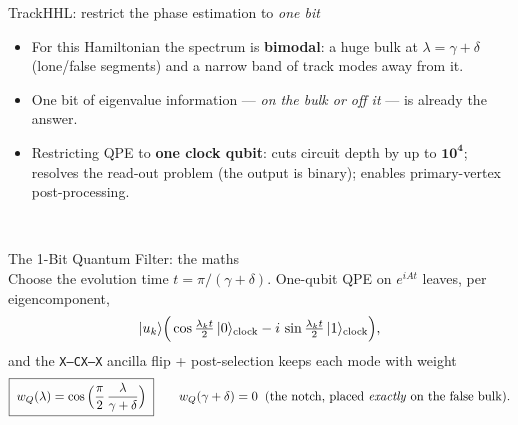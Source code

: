 \begin{frame}{TrackHHL: restrict the phase estimation to \emph{one bit}}
  \begin{itemize}
    \item For this Hamiltonian the spectrum is \textbf{bimodal}: a huge bulk at $\lambda=\gamma+\delta$ (lone/false segments) and a narrow band of track modes away from it.
    \item One bit of eigenvalue information --- \emph{on the bulk or off it} --- is already the answer.
    \item Restricting QPE to \textbf{one clock qubit}:
      cuts circuit depth by up to $\mathbf{10^4}$; \quad
      resolves the read-out problem (the output is binary); \quad
      enables primary-vertex post-processing.
  \end{itemize}
  \centering{}\\
\end{frame}

\begin{frame}{The 1-Bit Quantum Filter: the maths}
  \\[2pt]
  Choose the evolution time $t=\pi/(\gamma+\delta)$. One-qubit QPE on $e^{iAt}$ leaves, per eigencomponent,
  \[ |u_k\rangle\Big(\cos\tfrac{\lambda_k t}{2}\,|0\rangle_{\rm clock} - i\,\sin\tfrac{\lambda_k t}{2}\,|1\rangle_{\rm clock}\Big), \]
  and the \texttt{X--CX--X} ancilla flip + post-selection keeps each mode with weight
  \[ \boxed{\;w_Q(\lambda)=\cos\Big(\frac{\pi}{2}\,\frac{\lambda}{\gamma+\delta}\Big)\;}\qquad
     w_Q(\gamma+\delta)=0\;\;\text{(the notch, placed \emph{exactly} on the false bulk)}. \]
  \centering{}\\
\end{frame}

